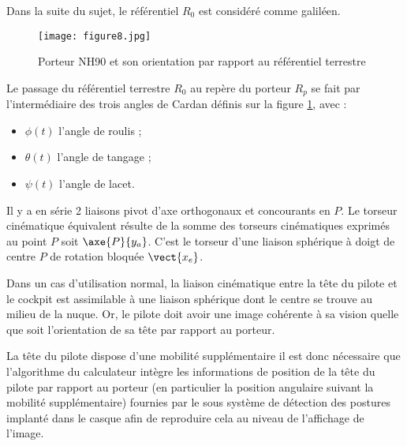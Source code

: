 Dans la suite du sujet, le référentiel \textbf{$R_0$} est considéré comme galiléen.

\begin{figure}[!htb]
\begin{center}
\texttt{[image: figure8.jpg]}
\caption{Porteur NH90 et son orientation par rapport au référentiel terrestre \label{figure8}}
\end{center}
\end{figure}

Le passage du référentiel terrestre $R_0$ au repère du porteur $R_p$ se fait par l'intermédiaire des trois angles de
Cardan définis sur la figure \ref{figure8}, avec :
\begin{itemize}
\item $\phi(t)$ l'angle de roulis ;
\item $\theta(t)$ l'angle de tangage ;
\item $\psi(t)$ l'angle de lacet.
\end{itemize}

\ifprof
\begin{corrige}
Il y a en série 2 liaisons pivot d'axe orthogonaux et concourants en $P$. Le torseur cinématique équivalent résulte de la somme des torseurs cinématiques exprimés au point $P$ soit $\axe{P}{y_a}$. C'est le torseur d'une liaison sphérique à doigt de centre $P$ de rotation bloquée $\vect{x_e}$.
\end{corrige}
\else
\fi
Dans un cas d'utilisation normal, la liaison cinématique entre la tête du pilote et le cockpit est assimilable à une
liaison sphérique dont le centre se trouve au milieu de la nuque. Or, le pilote doit avoir une image cohérente à
sa vision quelle que soit l'orientation de sa tête par rapport au porteur.

\ifprof
\begin{corrige}
La tête du pilote dispose d'une mobilité supplémentaire il est donc nécessaire que l'algorithme du calculateur intègre les informations de position de la tête du pilote par rapport au porteur (en particulier la position angulaire suivant la mobilité supplémentaire) fournies par le sous système de détection des postures implanté dans le casque afin de reproduire cela au niveau de l'affichage de l'image.
\end{corrige}
\else
\fi
